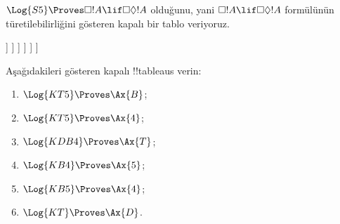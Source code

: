 \begin{ex}
  $\Log{S5} \Proves \Box!A \lif \Box\Diamond!A$ olduğunu, yani
  $\Box!A \lif \Box\Diamond!A$ formülünün türetilebilirliğini gösteren kapalı
  bir tablo veriyoruz.
  \begin{oltableau}
    [\pFmla{\False}{\Box\formula{A} \lif \Box\Diamond \formula{A}}{1},
      just = \TAss
      [\pFmla{\True}{\Box \formula{A}}{1}, just = {\TRule{\False}{\lif}[1]}
        [\pFmla{\False}{\Box\Diamond \formula{A}}{1},
          just = {\TRule{\False}{\lif}[1]}
          [\pFmla{\False}{\Diamond \formula{A}}{1.1},
            just = {\TRule{\False}{\Box}[3]}
            [\pFmla{\False}{\Diamond \formula{A}}{1},
              just = {4r$\Diamond$ 4}
              [\pFmla{\False}{\formula{A}}{1.1},
                just = {\TRule{\False}{\Diamond}[5]}
                [\pFmla{\True}{\formula{A}}{1.1},
                  just = {\TRule{\True}{\Box}[2]}, close]
              ]
            ]
          ]
        ]
      ]
    ]
  \end{oltableau}
\end{ex}

\begin{prob}
Aşağıdakileri gösteren kapalı !!{tableau}s verin:
  \begin{enumerate}
  \item $\Log{KT5} \Proves \Ax{B}$;
  \item $\Log{KT5} \Proves \Ax{4}$;
  \item $\Log{KDB4} \Proves \Ax{T}$;
  \item $\Log{KB4} \Proves \Ax{5}$;
  \item $\Log{KB5} \Proves \Ax{4}$;
  \item $\Log{KT} \Proves \Ax{D}$.
  \end{enumerate}
\end{prob}


